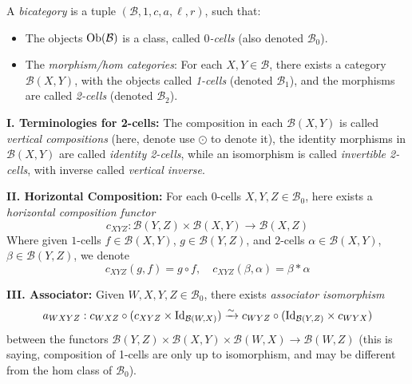 \documentclass{article}
\begin{document}
\begin{defn}
    A \emph{bicategory} is a tuple $(\mathcal{B},1,c,a,\ell,r)$, such that:
    \begin{itemize}
        \item The objects $\mathrm{Ob}(\mathcal{B})$ is a class, called \emph{$0$-cells} (also denoted $\mathcal{B}_0$).
        \item The \emph{morphism/hom categories}: For each $X,Y\in\mathcal{B}$, there exists a category $\mathcal{B}(X,Y)$, with the objects called \emph{1-cells} (denoted $\mathcal{B}_1$), and the morphisms are called \emph{2-cells} (denoted $\mathcal{B}_2$).
    \end{itemize}

    \hfil

    \textbf{I. Terminologies for 2-cells:} The composition in each $\mathcal{B}(X,Y)$ is called \emph{vertical compositions} (here, denote use $\odot$ to denote it), the identity morphisms in $\mathcal{B}(X,Y)$ are called \emph{identity 2-cells}, while an isomorphism is called \emph{invertible 2-cells}, with inverse called \emph{vertical inverse}.

    \hfil

    \textbf{II. Horizontal Composition:} For each 0-cells $X,Y,Z\in\mathcal{B}_0$, here exists a \emph{horizontal composition functor}
    \[c_{XYZ}:\mathcal{B}(Y,Z)\times \mathcal{B}(X,Y)\rightarrow \mathcal{B}(X,Z)\]
    Where given $1$-cells $f\in\mathcal{B}(X,Y)$, $g\in\mathcal{B}(Y,Z)$, and $2$-cells $\alpha\in\mathcal{B}(X,Y)$, $\beta\in\mathcal{B}(Y,Z)$, we denote
    \[c_{XYZ}(g,f)= g\circ f,\quad c_{XYZ}(\beta,\alpha) = \beta*\alpha\]

    \hfil

    \textbf{III. Associator:} Given $W,X,Y,Z\in\mathcal{B}_0$, there exists \emph{associator isomorphism}
    \[a_{WXYZ}:c_{WXZ}\circ (c_{XYZ}\times \mathrm{Id}_{\mathcal{B}(W,X)})\xrightarrow{\sim}c_{WYZ}\circ (\mathrm{Id}_{\mathcal{B}(Y,Z)}\times c_{WYX})\]
    between the functors $\mathcal{B}(Y,Z)\times \mathcal{B}(X,Y)\times\mathcal{B}(W,X)\rightarrow \mathcal{B}(W,Z)$ (this is saying, composition of 1-cells are only up to isomorphism, and may be different from the hom class of $\mathcal{B}_0$).



\end{defn}
\end{document}
